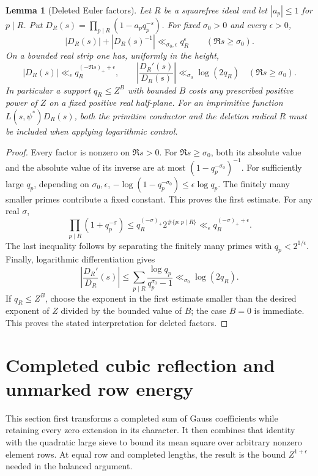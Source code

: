 \documentclass[11pt,a4paper]{article}
\numberwithin{equation}{section}
\numberwithin{figure}{section}
\newtheorem{lemma}[theorem]{Lemma}
\theoremstyle{definition}
\theoremstyle{remark}
\begin{document}
\begin{lemma}[Deleted Euler factors]\label{lem:deleted-euler-factors}
Let $R$ be a squarefree ideal and let $|a_p|\le1$ for $p\mid R$.  Put
$D_R(s)=\prod_{p\mid R}(1-a_pq_p^{-s})$.  For fixed $\sigma_0>0$ and every
$\epsilon>0$,
\[
 |D_R(s)|+|D_R(s)^{-1}|\ll_{\sigma_0,\epsilon}q_R^\epsilon
       \qquad(\Re s\ge\sigma_0).
\]
On a bounded real strip one has, uniformly in the height,
\[
 |D_R(s)|\ll_\epsilon q_R^{(-\Re s)_++\epsilon},
 \qquad
 \left|\frac{D_R'(s)}{D_R(s)}\right|
 \ll_{\sigma_0}\log(2q_R)\quad(\Re s\ge\sigma_0).
\]
In particular a support $q_R\le Z^B$ with bounded $B$ costs any prescribed
positive power of $Z$ on a fixed positive real half-plane.  For an
imprimitive function $L(s,\psi^*)D_R(s)$, both the primitive conductor and
the deletion radical $R$ must be included when applying logarithmic control.
\end{lemma}

\begin{proof}
Every factor is nonzero on $\Re s>0$.  For $\Re s\ge\sigma_0$, both its
absolute value and the absolute value of its inverse are at most
$(1-q_p^{-\sigma_0})^{-1}$.  For sufficiently large $q_p$, depending on
$\sigma_0,\epsilon$,
$-\log(1-q_p^{-\sigma_0})\le\epsilon\log q_p$.  The finitely many smaller
primes contribute a fixed constant.  This proves the first estimate.
For any real $\sigma$,
\[
 \prod_{p\mid R}(1+q_p^{-\sigma})
 \le q_R^{(-\sigma)_+}2^{\#\{p:p\mid R\}}
 \ll_\epsilon q_R^{(-\sigma)_++\epsilon}.
\]
The last inequality follows by separating the finitely many primes with
$q_p<2^{1/\epsilon}$.  Finally, logarithmic differentiation gives
\[
 \left|\frac{D_R'}{D_R}(s)\right|
 \le\sum_{p\mid R}\frac{\log q_p}{q_p^{\sigma_0}-1}
 \ll_{\sigma_0}\log(2q_R).
\]
If $q_R\le Z^B$, choose the exponent in the first estimate smaller than the
desired exponent of $Z$ divided by the bounded value of $B$; the case $B=0$
is immediate.  This proves the stated interpretation for deleted factors.
\end{proof}

\section{Completed cubic reflection and unmarked row energy}
\label{sec:completed-reflection}

This section first transforms a completed sum of Gauss coefficients while
retaining every zero extension in its character.  It then combines that
identity with the quadratic large sieve to bound its mean square over
arbitrary nonzero element rows.  At equal row and completed lengths, the
result is the bound $Z^{1+\epsilon}$ needed in the balanced argument.
\end{document}
